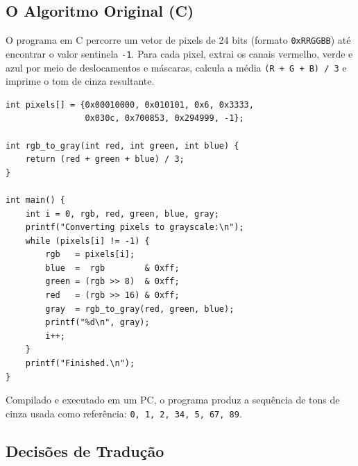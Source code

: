 \documentclass[12pt, a4paper]{article}
\begin{document}
\subsection{O Algoritmo Original (C)}

O programa em C percorre um vetor de pixels de 24 bits (formato \texttt{0xRRGGBB}) até encontrar o valor sentinela \texttt{-1}. Para cada pixel, extrai os canais vermelho, verde e azul por meio de deslocamentos e máscaras, calcula a média \texttt{(R + G + B) / 3} e imprime o tom de cinza resultante.

\begin{lstlisting}[style=c, caption={ex2.c}]
int pixels[] = {0x00010000, 0x010101, 0x6, 0x3333,
                0x030c, 0x700853, 0x294999, -1};

int rgb_to_gray(int red, int green, int blue) {
    return (red + green + blue) / 3;
}

int main() {
    int i = 0, rgb, red, green, blue, gray;
    printf("Converting pixels to grayscale:\n");
    while (pixels[i] != -1) {
        rgb   = pixels[i];
        blue  =  rgb        & 0xff;
        green = (rgb >> 8)  & 0xff;
        red   = (rgb >> 16) & 0xff;
        gray  = rgb_to_gray(red, green, blue);
        printf("%d\n", gray);
        i++;
    }
    printf("Finished.\n");
}
\end{lstlisting}

Compilado e executado em um PC, o programa produz a sequência de tons de cinza usada como referência: \texttt{0, 1, 2, 34, 5, 67, 89}.

\subsection{Decisões de Tradução}
\end{document}
